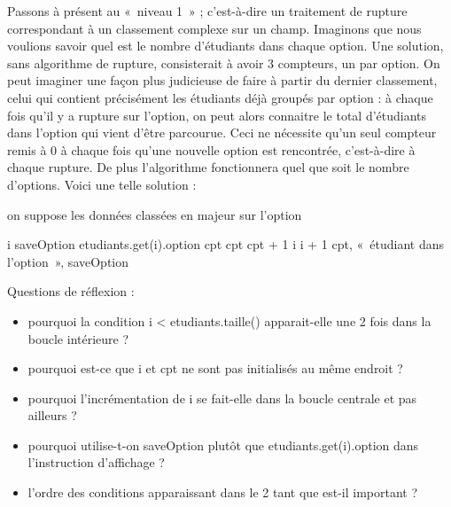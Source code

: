 	Passons à présent au «~niveau 1~» ; c’est-à-dire un traitement de
	rupture correspondant à un classement complexe sur un champ. 
	Imaginons que nous voulions savoir quel est le nombre d’étudiants dans chaque option. 
	Une solution, sans algorithme de rupture, consisterait à avoir 3 compteurs, un par option.
	On peut imaginer une façon plus judicieuse de faire à partir du dernier classement, celui
	qui contient précisément les étudiants déjà groupés par option : 
	à chaque fois qu’il y a rupture sur l’option, 
	on peut alors connaitre le total d’étudiants dans l’option qui vient d’être parcourue. 
	Ceci ne nécessite qu’un seul compteur remis à 0 à chaque fois qu’une nouvelle
	option est rencontrée, c’est-à-dire à chaque rupture. 
	De plus l’algorithme fonctionnera quel que soit le nombre d’options. 
	Voici une telle solution : 

	\begin{LDA}
		\label{algo:rupt1}
			\LComment on suppose les données classées en majeur sur l’option
	
			\Let i 
				\Let saveOption \Gets etudiants.get(i).option
				\Let cpt 
					\Let cpt \Gets cpt + 1
					\Let i \Gets i + 1
				\EndWhile
				\Write cpt, «~étudiant dans l’option~», saveOption
			\EndWhile
		\EndAlgo
	\end{LDA}

	\medskip
	Questions de réflexion :
	\begin{itemize}
		\item 
			pourquoi la condition \textsf{i < etudiants.taille()}
			apparait-elle une 2\ieme{} fois dans la boucle intérieure ?
		\item 
			pourquoi est-ce que \textsf{i} et \textsf{cpt} 
			ne sont pas initialisés au même endroit ?
		\item 
			pourquoi l'incrémentation de \textsf{i} se fait-elle dans la boucle centrale 
			et pas ailleurs ?
		\item 
			pourquoi utilise-t-on 
			\textsf{saveOption} plutôt que \textsf{etudiants.get(i).option}
			dans l’instruction d’affichage ?
		\item 
			l’ordre des conditions apparaissant dans le 2\ieme{} \og{}tant que\fg{} 
			est-il important ?
	\end{itemize}

